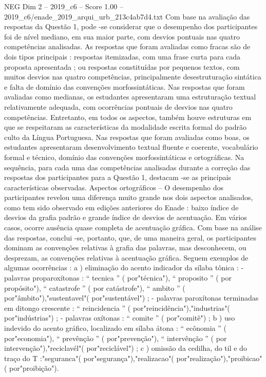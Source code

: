 \begin{textsample}{NEG Dim 2 – 2019\_c6 – Score 1.00 – 2019\_c6/enade\_2019\_arqui\_urb\_213c4ab7d4.txt}
Com base na avaliação das respostas da Questão 1, pode -se considerar que o desempenho dos participantes foi de nível mediano, em sua maior parte, com desvios pontuais nas quatro competências analisadas.
As respostas que foram avaliadas como fracas são de dois tipos principais : respostas itemizadas, com uma frase curta para cada proposta apresentada ; ou respostas constituídas por pequenos textos, com muitos desvios nas quatro competências, principalmente desestruturação sintática e falta de domínio das convenções morfossintáticas.
Nas respostas que foram avaliadas como medianas, os estudantes apresentaram uma estruturação textual relativamente adequada, com ocorrências pontuais de desvios nas quatro competências.
Entretanto, em todos os aspectos, também houve estruturas em que se respeitaram as características da modalidade escrita formal do padrão culto da Língua Portuguesa.
Nas respostas que foram avaliadas como boas, os estudantes apresentaram desenvolvimento textual fluente e coerente, vocabulário formal e técnico, domínio das convenções morfossintáticas e ortográficas.
Na sequência, para cada uma das competências analisadas durante a correção das respostas dos participantes para a Questão 1, destacam -se as principais características observadas.
Aspectos ortográficos – O desempenho dos participantes revelou uma diferença muito grande nos dois aspectos analisados, como tem sido observado em edições anteriores do Enade : baixo índice de desvios da grafia padrão e grande índice de desvios de acentuação.
Em vários casos, ocorre ausência quase completa de acentuação gráfica.
Com base na análise das respostas, conclui -se, portanto, que, de uma maneira geral, os participantes dominam as convenções relativas à grafia das palavras, mas desconhecem, ou desprezam, as convenções relativas à acentuação gráfica.
Seguem exemplos de algumas ocorrências : a ) eliminação do acento indicador da sílaba tônica : - palavras proparoxítonas : “ tecnica ” ( por"técnica"), “ proposito ” ( por propósito"), “ catastrofe ” ( por catástrofe"), “ ambito ” ( por"âmbito"),"sustentavel"( por"sustentável") ; - palavras paroxítonas terminadas em ditongo crescente : “ reincidencia ” ( por"reincidência"),"industrias"( por"indústrias") ; - palavras oxítonas : “ comite ” ( por"comitê") ; b ) uso indevido do acento gráfico, localizado em sílaba átona : “ ecônomia ” ( por"economia"), “ prevênção ” ( por"prevenção"), “ intervênção ” ( por intervenção"),"reciclavél"( por"reciclável") ; c ) omissão da cedilha, do til e do traço do T :"seguranca"( por"segurança"),"realizacao"( por"realização"),"proibicao"( por"proibição").

\end{textsample}
